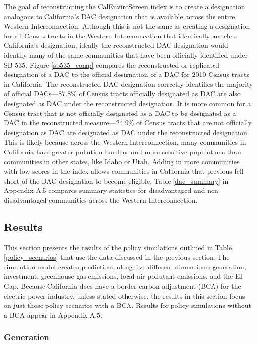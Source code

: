 The goal of reconstructing the CalEnviroScreen index is to create a designation analogous to California's DAC designation that is available across the entire Western Interconnection. Although this is not the same as creating a designation for all Census tracts in the Western Interconnection that identically matches California's designation, ideally the reconstructed DAC designation would identify many of the same communities that have been officially identified under SB 535. Figure \ref{sb535_comp} compares the reconstructed or replicated designation of a DAC to the official designation of a DAC for 2010 Census tracts in California. The reconstructed DAC designation correctly identifies the majority of official DACs---87.8\% of Census tracts officially designated as DAC are also designated as DAC under the reconstructed designation. It is more common for a Census tract that is not officially designated as a DAC to be designated as a DAC in the reconstructed measure---24.9\% of Census tracts that are not officially designation as DAC are designated as DAC under the reconstructed designation. This is likely because across the Western Interconnection, many communities in California have greater pollution burdens and more sensitive populations than communities in other states, like Idaho or Utah. Adding in more communities with low scores in the index allows communities in California that previous fell short of the DAC designation to become eligible. Table \ref{dac_summary} in Appendix A.5 compares summary statistics for disadvantaged and non-disadvantaged communities across the Western Interconnection.

\subsection{Results}

This section presents the results of the policy simulations outlined in Table \ref{policy_scenarios} that use the data discussed in the previous section. The simulation model creates predictions along five different dimensions: generation, investment, greenhouse gas emissions, local air pollutant emissions, and the EI Gap. Because California does have a border carbon adjustment (BCA) for the electric power industry, unless stated otherwise, the results in this section focus on just those policy scenarios with a BCA. Results for policy simulations without a BCA appear in Appendix A.5.

\subsubsection*{Generation}

